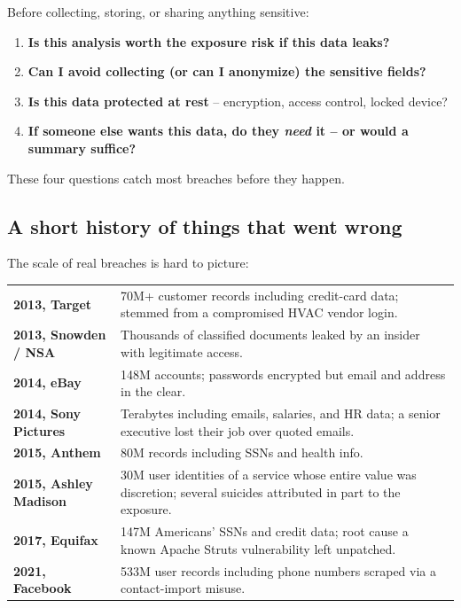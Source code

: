 \documentclass[11pt]{article}
\begin{document}
\begin{ideabox}
Before collecting, storing, or sharing anything sensitive:
\begin{enumerate}[leftmargin=*,noitemsep]
    \item \textbf{Is this analysis worth the exposure risk if this
          data leaks?}
    \item \textbf{Can I avoid collecting (or can I anonymize) the
          sensitive fields?}
    \item \textbf{Is this data protected at rest} -- encryption,
          access control, locked device?
    \item \textbf{If someone else wants this data, do they
          \emph{need} it -- or would a summary suffice?}
\end{enumerate}
These four questions catch most breaches before they happen.
\end{ideabox}

\subsection{A short history of things that went wrong}

The scale of real breaches is hard to picture:

\begin{center}
\small
\begin{tabular}{p{2.2cm} p{9.8cm}}
\hline
\textbf{2013, Target} & 70M+ customer records including credit-card
data; stemmed from a compromised HVAC vendor login. \\
\textbf{2013, Snowden / NSA} & Thousands of classified documents
leaked by an insider with legitimate access. \\
\textbf{2014, eBay} & 148M accounts; passwords encrypted but email
and address in the clear. \\
\textbf{2014, Sony Pictures} & Terabytes including emails, salaries,
and HR data; a senior executive lost their job over quoted emails. \\
\textbf{2015, Anthem} & 80M records including SSNs and health info. \\
\textbf{2015, Ashley Madison} & 30M user identities of a service
whose entire value was discretion; several suicides attributed in
part to the exposure. \\
\textbf{2017, Equifax} & 147M Americans' SSNs and credit data; root
cause a known Apache Struts vulnerability left unpatched. \\
\textbf{2021, Facebook} & 533M user records including phone numbers
scraped via a contact-import misuse. \\
\hline
\end{tabular}
\normalsize
\end{center}
\end{document}
